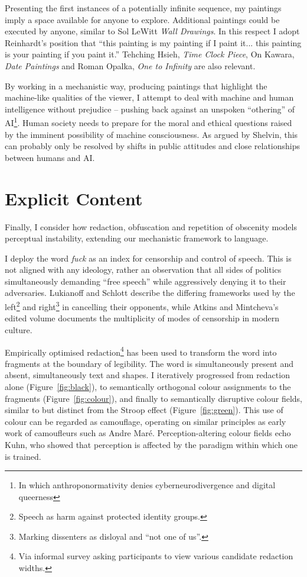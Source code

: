 \documentclass[12pt]{article}
\begin{document}
Presenting the first instances of a
potentially infinite sequence, my paintings imply a space available
for anyone to explore. Additional paintings could be executed by
anyone, similar to Sol LeWitt \emph{Wall Drawings}. In this respect I
adopt Reinhardt's position that ``this painting is my painting if I
paint it... this painting is your painting if you paint
it.''\cite{abstract-painting-1960} Tehching Hsieh, \emph{Time Clock
  Piece}, On Kawara, \emph{Date Paintings} and Roman Opalka, \emph{One
  to Infinity} are also relevant.

By working in a mechanistic way, producing paintings that highlight
the machine-like qualities of the viewer, I attempt to deal with
machine and human intelligence without prejudice -- pushing back
against an unspoken ``othering'' of AI\footnote{In which anthroponormativity denies cyberneurodivergence and digital queerness}. Human society needs to prepare
for the moral and ethical
questions\cite{chalmers1996conscious,metzinger2009egotunnel,bostrom2014ethics}
raised by the imminent possibility of machine consciousness. As argued by
Shelvin, this can probably only be
resolved by shifts in public attitudes and close relationships between
humans and AI.\cite{shevlin2023consciousness}

\section{Explicit Content}
Finally, I consider how redaction, obfuscation and repetition of
obscenity models perceptual instability, extending our mechanistic
framework to language.

I deploy the word \emph{fuck} as an index for censorship and control
of speech.  This is not aligned with any ideology, rather an
observation that all sides of politics simultaneously demanding ``free
speech'' while aggressively denying it to their adversaries. Lukianoff
and Schlott\cite[Chapter 6, 7]{lukianoff2023cancelling} describe the
differing frameworks used by the left\footnote{Speech as harm against
  protected identity groups.} and right\footnote{Marking dissenters as
  disloyal and ``not one of us''.} in cancelling their opponents, while
Atkins and Mintcheva's edited volume documents the multiplicity of
modes of censorship in modern culture.\cite{atkins2006censoring}

Empirically optimised redaction\footnote{Via informal survey asking
  participants to view various candidate redaction widths.} has been
used to transform the word into fragments at the boundary of
legibility. The word is simultaneously present and absent,
simultaneously text and shapes. I iteratively progressed from
redaction alone (Figure~\ref{fig:black}), to semantically orthogonal
colour assignments to the fragments (Figure~\ref{fig:colour}), and
finally to semantically disruptive colour fields, similar to but
distinct from the Stroop effect\cite{stroop1935studies}
(Figure~\ref{fig:green}). This use of colour can be regarded as
camouflage, operating on similar principles as early work of
camoufleurs such as Andre Mar\'e. Perception-altering colour fields
echo Kuhn, who showed that perception is affected by the paradigm
within which one is trained.\cite{kuhn1970structure}
\end{document}
